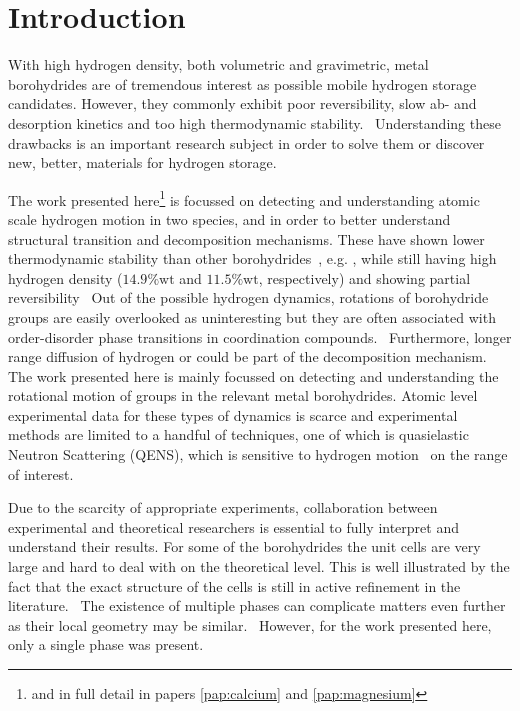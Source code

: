 \section{Introduction}
\label{sec:borohydrides-introduction}
With high hydrogen density, both volumetric and gravimetric, metal borohydrides are of tremendous interest as possible mobile hydrogen storage candidates.
However, they commonly exhibit poor reversibility, slow ab- and desorption kinetics and too high thermodynamic stability.~\cite{lithium-stability-2003, borohydride-stability-2006, calcium-stability-2006}
Understanding these drawbacks is an important research subject in order to solve them or discover new, better, materials for hydrogen storage.

The work presented here\footnote{and in full detail in papers \ref{pap:calcium} and \ref{pap:magnesium}} is focussed on detecting and understanding atomic scale hydrogen motion in two species,  and  in order to better understand structural transition and decomposition mechanisms.
These have shown lower thermodynamic stability than other borohydrides~\cite{borohydride-stability-2006, calcium-stability-2006}, e.g. , while still having high hydrogen density ($14.9\%\text{wt}$ and $11.5\%\text{wt}$, respectively) and showing partial reversibility~\cite{magnesium-reversibility-severa-2010, magnesium-reversibility-chong-2011, calcium-reversibility-2007, calcium-reversibility-2008, reversibility-destabilisation-2008}
Out of the possible hydrogen dynamics, rotations of borohydride groups are easily overlooked as uninteresting but they are often associated with order-disorder phase transitions in coordination compounds.~\cite{order-disorder-2006, order-disorder-2010}
Furthermore, longer range diffusion of hydrogen or  could be part of the decomposition mechanism.
The work presented here is mainly focussed on detecting and understanding the rotational motion of  groups in the relevant metal borohydrides.
Atomic level experimental data for these types of dynamics is scarce and experimental methods are limited to a handful of techniques, one of which is quasielastic Neutron Scattering (QENS), which is sensitive to hydrogen motion~\cite{qens-bee-1988} on the range of interest.

Due to the scarcity of appropriate experiments, collaboration between experimental and theoretical researchers is essential to fully interpret and understand their results.
For some of the borohydrides the unit cells are very large and hard to deal with on the theoretical level.
This is well illustrated by the fact that the exact structure of the cells is still in active refinement in the literature.~\cite{cabh42-structure-p42m, cabh42-structure-p4}
The existence of multiple phases can complicate matters even further as their local geometry may be similar.~\cite{mgbh42-structure-fddd, mgbh42-phases-2007, mgbh42-phases-2008, mgbh42-phases-2009}
However, for the work presented here, only a single phase was present.

